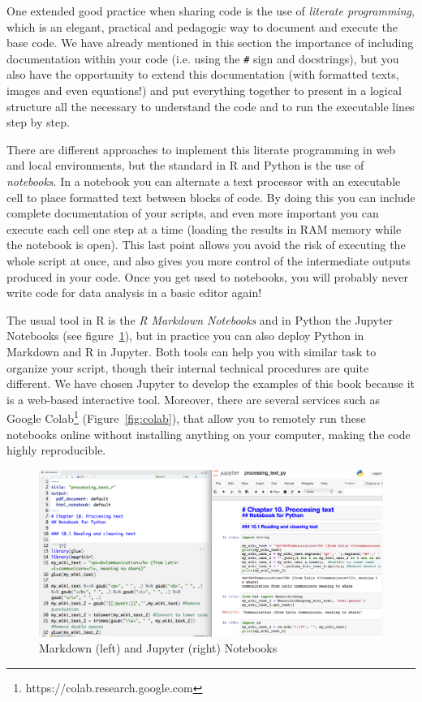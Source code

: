 One extended good practice when sharing code is the use of \textit{literate programming}, which is an elegant, practical and pedagogic way to document and execute the base code. We have already mentioned in this section the importance of including documentation within your code (i.e. using the \texttt{\#} sign and docstrings), but you also have the opportunity to extend this documentation (with formatted texts, images and even equations!) and put everything together to present in a logical structure all the necessary to understand the code and to run the executable lines step by step. 

There are different approaches to implement this literate programming in web and local environments, but the standard in R and Python is the use of \textit{notebooks}. In a notebook you can alternate a text processor with an executable cell to place formatted text between blocks of code. By doing this you can include complete documentation of your scripts, and even more important you can execute each cell one step at a time (loading the results in RAM memory while the notebook is open). This last point allows you avoid the risk of executing the whole script at once, and also gives you more control of the intermediate outputs produced in your code. Once you get used to notebooks, you will probably never write code for data analysis in a basic editor again!

The usual tool in R is the \textit{R Markdown Notebooks} and in Python the Jupyter Notebooks (see figure~\ref{fig:notebooks}), but in practice you can also deploy Python in Markdown and R in Jupyter. Both tools can help you with similar task to organize your script, though their internal technical procedures are quite different. We have chosen Jupyter to develop the examples of this book because it is a web-based interactive tool. Moreover, there are several services such as Google Colab\footnote{https://colab.research.google.com} (Figure~\ref{fig:colab}), that allow you to remotely run these notebooks online without installing anything on your computer, making the code highly reproducible.

\begin{figure}
\centering
\includegraphics[width=0.9\linewidth]{figures/ch04_notebooks}
\caption{Markdown (left) and Jupyter (right) Notebooks}
\label{fig:notebooks}
\end{figure}

